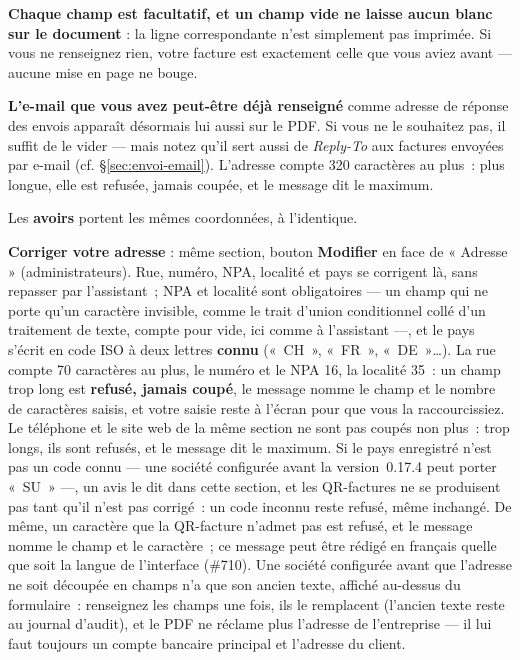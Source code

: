 \documentclass[a4paper,11pt,oneside]{article}
\begin{document}
\begin{keshnote}
\textbf{Chaque champ est facultatif, et un champ vide ne laisse aucun blanc sur le document} : la ligne correspondante n'est simplement pas imprimée. Si vous ne renseignez rien, votre facture est exactement celle que vous aviez avant --- aucune mise en page ne bouge.
\end{keshnote}

\textbf{L'e-mail que vous avez peut-être déjà renseigné} comme adresse de réponse des envois apparaît désormais lui aussi sur le PDF. Si vous ne le souhaitez pas, il suffit de le vider --- mais notez qu'il sert aussi de \emph{Reply-To} aux factures envoyées par e-mail (cf. \S\ref{sec:envoi-email}). L'adresse compte 320 caractères au plus~: plus longue, elle est refusée, jamais coupée, et le message dit le maximum.

Les \textbf{avoirs} portent les mêmes coordonnées, à l'identique.

\textbf{Corriger votre adresse} : même section, bouton \textbf{Modifier} en face de « Adresse » (administrateurs). Rue, numéro, NPA, localité et pays se corrigent là, sans repasser par l'assistant~; NPA et localité sont obligatoires --- un champ qui ne porte qu'un caractère invisible, comme le trait d'union conditionnel collé d'un traitement de texte, compte pour vide, ici comme à l'assistant ---, et le pays s'écrit en code ISO à deux lettres \textbf{connu} («~CH~», «~FR~», «~DE~»…). La rue compte 70 caractères au plus, le numéro et le NPA 16, la localité 35~: un champ trop long est \textbf{refusé, jamais coupé}, le message nomme le champ et le nombre de caractères saisis, et votre saisie reste à l'écran pour que vous la raccourcissiez. Le téléphone et le site web de la même section ne sont pas coupés non plus~: trop longs, ils sont refusés, et le message dit le maximum. Si le pays enregistré n'est pas un code connu --- une société configurée avant la version~0.17.4 peut porter «~SU~» ---, un avis le dit dans cette section, et les QR-factures ne se produisent pas tant qu'il n'est pas corrigé~: un code inconnu reste refusé, même inchangé. De même, un caractère que la QR-facture n'admet pas est refusé, et le message nomme le champ et le caractère~; ce message peut être rédigé en français quelle que soit la langue de l'interface (\#710). Une société configurée avant que l'adresse ne soit découpée en champs n'a que son ancien texte, affiché au-dessus du formulaire~: renseignez les champs une fois, ils le remplacent (l'ancien texte reste au journal d'audit), et le PDF ne réclame plus l'adresse de l'entreprise --- il lui faut toujours un compte bancaire principal et l'adresse du client.
\end{document}
